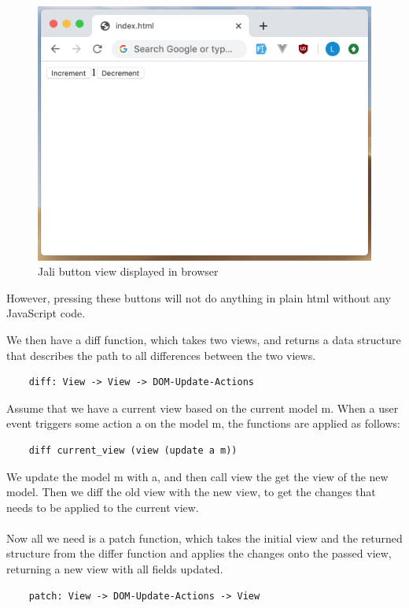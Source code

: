 \begin{figure}
    \centering
    \includegraphics[width=\textwidth]{images/jali-button-in-browser.png}
    \caption{Jali button view displayed in browser}
    \label{fig:jali-buttons-in-browser}
\end{figure}

However, pressing these buttons will not do anything in plain html without any JavaScript code. 




We then have a diff function, which takes two views, and returns a data structure that describes the path to all differences between the two views.

\begin{verbatim}
    diff: View -> View -> DOM-Update-Actions
\end{verbatim}

Assume that we have a current view based on the current model m. When a user event triggers some action a on the model m, the functions are applied as follows:

\begin{verbatim}
    diff current_view (view (update a m))
\end{verbatim}

We update the model m with a, and then call view the get the view of the new model. Then we diff the old view with the new view, to get the changes that needs to be applied to the current view. 
\\\\
Now all we need is a patch function, which takes the initial view and the returned structure from the differ function and applies the changes onto the passed view, returning a new view with all fields updated.

\begin{verbatim}
    patch: View -> DOM-Update-Actions -> View
\end{verbatim}

%
